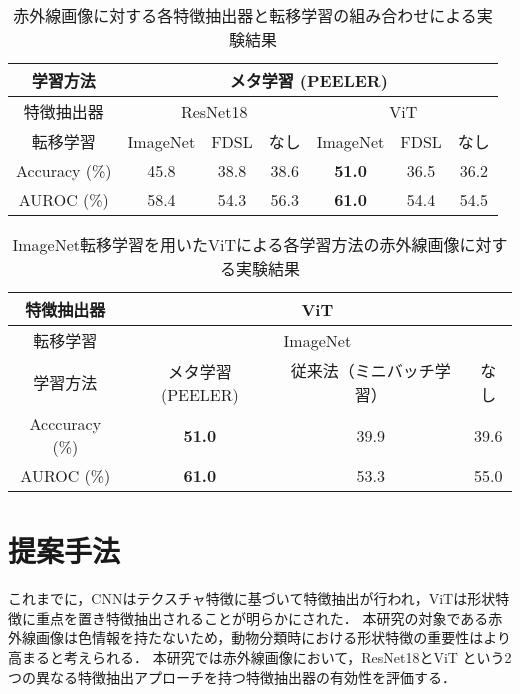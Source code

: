 \documentclass[uplatex,dvipdfmx,10pt,twocolumn]{jsarticle}
\begin{document}
\begin{table*}[tbp]
  \centering
	\caption{赤外線画像に対する各特徴抽出器と転移学習の組み合わせによる実験結果}
  \label{tbl:detection}
	\small
  \begin{tabular}{c||c|c|c|c|c|c}
    \hline
    学習方法            & \multicolumn{6}{c}{メタ学習 (PEELER)}                        \\ \hline
    特徴抽出器           & \multicolumn{3}{c|}{ResNet18} & \multicolumn{3}{c}{ViT}     \\ \hline
    転移学習            &  ImageNet  &  FDSL  &  なし   &   ImageNet    & FDSL & なし  \\ \hline\hline
    Accuracy (\%) &    45.8    &  38.8  &  38.6  & \textbf{51.0} & 36.5 & 36.2 \\
    AUROC (\%)   &    58.4    &  54.3  &  56.3  & \textbf{61.0} & 54.4 & 54.5 \\ \hline
  \end{tabular}
  \vspace{-4mm}
\end{table*}
\begin{table*}[tbp]
  \centering
  \caption{ImageNet転移学習を用いたViTによる各学習方法の赤外線画像に対する実験結果}
  \label{tbl:meta}
	\small
  \begin{tabular}{c||c|c|c}
    \hline
    特徴抽出器          &          \multicolumn{3}{c}{ViT}                \\ \hline
    転移学習            &          \multicolumn{3}{c}{ImageNet}           \\ \hline
    学習方法            & メタ学習 (PEELER)  & 従来法（ミニバッチ学習） & なし  \\ \hline\hline
    Acccuracy (\%)    &  \textbf{51.0}   &        39.9          & 39.6  \\
    AUROC (\%)        &  \textbf{61.0}   &        53.3          & 55.0  \\ \hline
  \end{tabular}
\end{table*}

\section{提案手法}

これまでに，CNNはテクスチャ特徴に基づいて特徴抽出が行われ，ViTは形状特徴に重点を置き特徴抽出されることが明らかにされた．
本研究の対象である赤外線画像は色情報を持たないため，動物分類時における形状特徴の重要性はより高まると考えられる．
本研究では赤外線画像において，ResNet18とViT という2 つの異なる特徴抽出アプローチを持つ特徴抽出器の有効性を評価する．
\end{document}
